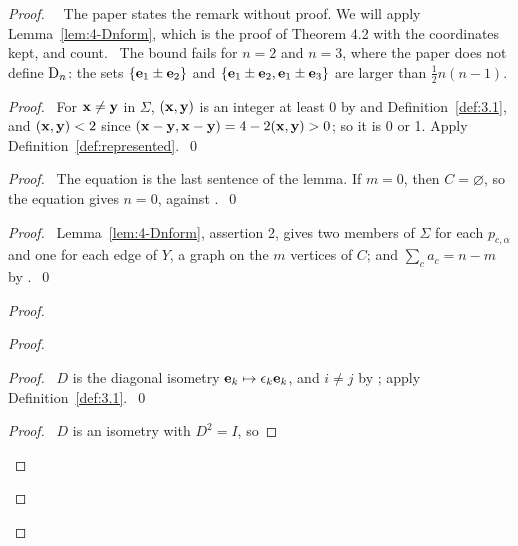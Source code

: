 \begin{proof}
 \pfsketch\ \new\ The paper states the remark without proof. We will apply
 Lemma~\ref{lem:4-Dnform}, which is the proof of Theorem 4.2 with the coordinates
 kept, and count. \new\ The bound fails for $n=2$ and $n=3$, where the paper does not define
 $\mathrm{D}_n$: the sets $\{{\mathbf e}_1\pm{\mathbf e}_2\}$ and $\{{\mathbf e}_1\pm{\mathbf e}_2,{\mathbf e}_1\pm{\mathbf e}_3\}$ are larger than
 $\frac12n(n-1)$.
 \begin{proof}\pf\ For ${\mathbf x}\ne{\mathbf y}$ in $\Sigma$, $({\mathbf x},{\mathbf y})$ is an integer at least 0 by
   and Definition~\ref{def:3.1}, and $({\mathbf x},{\mathbf y})<2$ since
  $({\mathbf x}-{\mathbf y},{\mathbf x}-{\mathbf y})=4-2({\mathbf x},{\mathbf y})>0$; so it is 0 or 1. Apply
  Definition~\ref{def:represented}.~\qed\end{proof}
 \begin{proof}\pf\ The equation is the last sentence of the lemma. If $m=0$, then
  $C=\varnothing$, so the equation gives $n=0$, against .~\qed\end{proof}
 \begin{proof}\pf\ Lemma~\ref{lem:4-Dnform}, assertion 2, gives two members of $\Sigma$ for each
  $p_{c,\alpha}$ and one for each edge of $Y$, a graph on the $m$ vertices of $C$; and $\sum_c
  a_c=n-m$ by .~\qed\end{proof}
 \begin{proof}
  \begin{proof}
   \begin{proof}\pf\ $D$ is the diagonal isometry ${\mathbf e}_k\mapsto\epsilon_k{\mathbf e}_k$, and $i\ne j$ by
    ; apply Definition~\ref{def:3.1}.~\qed\end{proof}
   \begin{proof}\pf\ $D$ is an isometry with $D^2=I$, so

\end{proof}
\end{proof}
\end{proof}
\end{proof}
